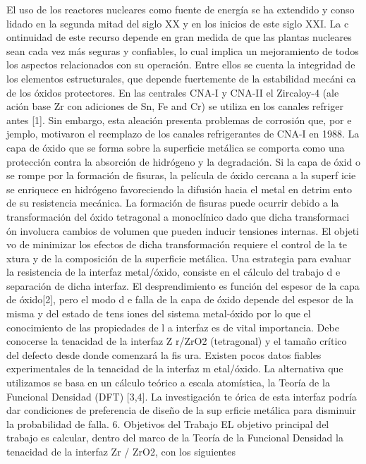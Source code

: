 El uso de los reactores nucleares como fuente de energía se ha extendido y conso
lidado en la segunda mitad del siglo XX y en los inicios de este siglo XXI. La c
ontinuidad de este recurso depende en gran medida de que las plantas nucleares 
sean cada vez más seguras y confiables, lo cual implica un mejoramiento de todos 
los aspectos relacionados con su operación. Entre ellos se cuenta la integridad de los elementos estructurales, que depende fuertemente de la estabilidad mecáni
ca de los óxidos protectores. En las centrales CNA-I y CNA-II el Zircaloy-4 (ale
ación base Zr con adiciones de Sn, Fe and Cr) se utiliza en los canales refriger
antes [1]. Sin embargo, esta aleación presenta problemas de corrosión que, por e
jemplo, motivaron el reemplazo de los canales refrigerantes de CNA-I en 1988.
La capa de óxido que se forma sobre la superficie metálica se comporta como una 
protección contra la absorción de hidrógeno y la degradación. Si la capa de óxid
o se rompe por la formación de fisuras, la película de óxido cercana a la superf
icie se enriquece en hidrógeno favoreciendo la difusión hacia el metal en detrim
ento de su resistencia mecánica. La formación de fisuras puede ocurrir debido a 
la transformación del óxido tetragonal a monoclínico dado que dicha transformaci
ón involucra cambios de volumen que pueden inducir tensiones internas. El objeti
vo de minimizar los efectos de dicha transformación requiere el control de la te
xtura y de la composición de la superficie metálica. Una estrategia para evaluar
 la resistencia de la interfaz metal/óxido, consiste en el cálculo del trabajo d
e separación de dicha interfaz.
El desprendimiento es función del espesor de la capa de óxido[2], pero el modo d
e falla de la capa de óxido depende del espesor de la misma y del estado de tens
iones del sistema metal-óxido por lo que el conocimiento de las propiedades de l
a interfaz es de vital importancia. Debe conocerse la tenacidad de la interfaz Z
r/ZrO2 (tetragonal) y el tamaño crítico del defecto desde donde comenzará la fis
ura. Existen pocos datos fiables experimentales de la tenacidad de la interfaz m
etal/óxido. La alternativa que utilizamos se basa en un cálculo teórico a escala
 atomística, la Teoría de la Funcional Densidad (DFT) [3,4]. La investigación te
órica de esta interfaz podría dar condiciones de preferencia de diseño de la sup
erficie metálica para disminuir la probabilidad de falla.
6. Objetivos del Trabajo
EL objetivo principal del trabajo es calcular, dentro del marco de la Teoría de 
la Funcional Densidad la tenacidad de la interfaz Zr / ZrO2, con los siguientes 
